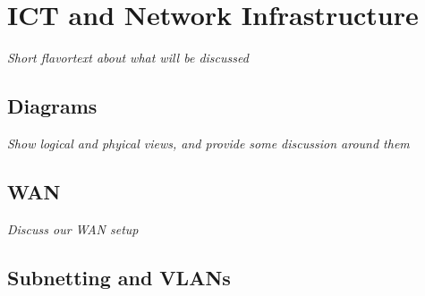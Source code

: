 \section{ICT and Network Infrastructure}

%

\textit{Short flavortext about what will be discussed}


\subsection{Diagrams}

\textit{Show logical and phyical views, and provide some discussion around them}

\subsection{WAN}

\textit{Discuss our WAN setup}

\subsection{Subnetting and VLANs}

% 

